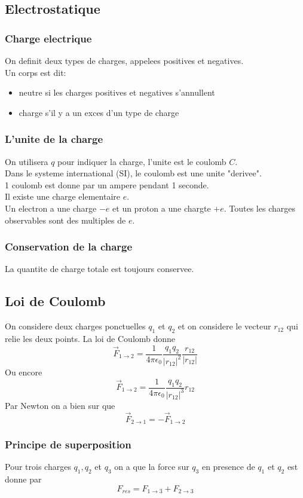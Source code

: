 \documentclass[../main.tex]{subfiles}
\begin{document}
\subsection{Electrostatique}
\subsubsection{Charge electrique}
On definit deux types de charges, appelees positives et negatives.\\
Un corps est dit:
\begin{itemize}
\item neutre si les charges positives et negatives s'annullent
\item charge s'il y a un exces d'un type de charge
\end{itemize}
\subsubsection{L'unite de la charge}
On utilisera $q$ pour indiquer la charge, l'unite est le coulomb $C$.\\
Dans le systeme international (SI), le coulomb est une unite "derivee".\\
1 coulomb est donne par un ampere pendant 1 seconde.\\
Il existe une charge elementaire $e$.\\
Un electron a une charge $-e$ et un proton a une chargte $+e$.
Toutes les charges observables sont des multiples de $e$.
\subsubsection*{Conservation de la charge}
La quantite de charge totale est toujours conservee.
\subsection{Loi de Coulomb}
On considere deux charges ponctuelles $q_1$ et $q_2$ et on considere le vecteur $r_{12}$ qui relie les deux points.
La loi de Coulomb donne
\[ 
\vec{F}_{1\to 2}  = \frac{1 }{4 \pi \epsilon_0}\frac{q_1 q_2}{|r_{12}|^{2}} \frac{r_{12}}{| r_{12}|}
\]
Ou encore
\[ 
	\vec{F}_{1\to 2}  = \frac{1 }{4 \pi \epsilon_0}\frac{q_1 q_2}{|r_{12}|^{3}} r_{12}
\]
Par Newton on a bien sur que
\[ 
\vec{F}_{2\to 1} = - \vec{F}_{1\to 2} 
\]
\subsubsection{Principe de superposition}
Pour trois charges $q_1,q_2$ et $q_3$ on a que la force sur $q_3$ en presence de $q_1$ et $q_2$ est donne par
\[ 
F_{res } = F_{1\to 3}  + F_{2 \to 3}  
\]
\end{document}
